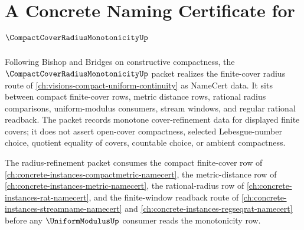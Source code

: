 \chapter{A Concrete Naming Certificate for $\CompactCoverRadiusMonotonicityUp$}
\label{ch:concrete-instances-compact-cover-radius-monotonicity-namecert}

Following Bishop and Bridges on constructive compactness, the $\CompactCoverRadiusMonotonicityUp$ packet realizes the finite-cover radius route of \autoref{ch:visions-compact-uniform-continuity} as NameCert data. It sits between compact finite-cover rows, metric distance rows, rational radius comparisons, uniform-modulus consumers, stream windows, and regular rational readback. The packet records monotone cover-refinement data for displayed finite covers; it does not assert open-cover compactness, selected Lebesgue-number choice, quotient equality of covers, countable choice, or ambient compactness.

The radius-refinement packet consumes the compact finite-cover row of \autoref{ch:concrete-instances-compactmetric-namecert}, the metric-distance row of \autoref{ch:concrete-instances-metric-namecert}, the rational-radius row of \autoref{ch:concrete-instances-rat-namecert}, and the finite-window readback route of \autoref{ch:concrete-instances-streamname-namecert} and \autoref{ch:concrete-instances-regseqrat-namecert} before any $\UniformModulusUp$ consumer reads the monotonicity row.

